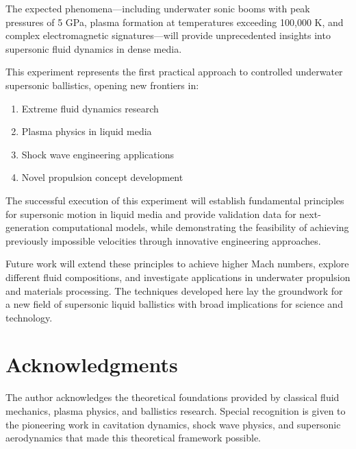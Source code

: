 \documentclass[12pt,a4paper]{article}
\begin{document}
The expected phenomena—including underwater sonic booms with peak pressures of 5 GPa, plasma formation at temperatures exceeding 100,000 K, and complex electromagnetic signatures—will provide unprecedented insights into supersonic fluid dynamics in dense media.

This experiment represents the first practical approach to controlled underwater supersonic ballistics, opening new frontiers in:
\begin{enumerate}
\item Extreme fluid dynamics research
\item Plasma physics in liquid media
\item Shock wave engineering applications
\item Novel propulsion concept development
\end{enumerate}

The successful execution of this experiment will establish fundamental principles for supersonic motion in liquid media and provide validation data for next-generation computational models, while demonstrating the feasibility of achieving previously impossible velocities through innovative engineering approaches.

Future work will extend these principles to achieve higher Mach numbers, explore different fluid compositions, and investigate applications in underwater propulsion and materials processing. The techniques developed here lay the groundwork for a new field of supersonic liquid ballistics with broad implications for science and technology.

\section*{Acknowledgments}

The author acknowledges the theoretical foundations provided by classical fluid mechanics, plasma physics, and ballistics research. Special recognition is given to the pioneering work in cavitation dynamics, shock wave physics, and supersonic aerodynamics that made this theoretical framework possible.
\end{document}
